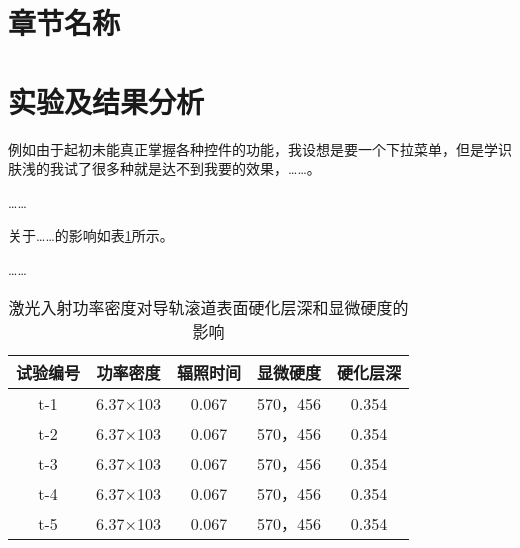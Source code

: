 \documentclass[../../main.tex]{subfiles}
\begin{document}
\section{章节名称}



\section{实验及结果分析}
例如由于起初未能真正掌握各种控件的功能，我设想是要一个下拉菜单，但是学识肤浅的我试了很多种就是达不到我要的效果，……。

……

关于……的影响如表\ref{data_table}所示。

……

\begin{table}[htbp]
        \small
        \newcommand{\tabincell}[2]{\begin{tabular}{@{}#1@{}}#2\end{tabular}}
        \centering
        \caption{激光入射功率密度对导轨滚道表面硬化层深和显微硬度的影响}
        \begin{tabular}{ccccc}
                \toprule
                试验编号 & 功率密度 & 辐照时间 & 显微硬度       & 硬化层深\\ \midrule
                t-1     &6.37×103       &0.067  &570，456        &0.354\\
                t-2     &6.37×103       &0.067  &570，456        &0.354\\
                t-3     &6.37×103       &0.067  &570，456        &0.354\\
                t-4     &6.37×103       &0.067  &570，456        &0.354\\
                t-5     &6.37×103       &0.067  &570，456        &0.354\\ \bottomrule
        \end{tabular}
        \label{data_table}
\end{table}
\end{document}
